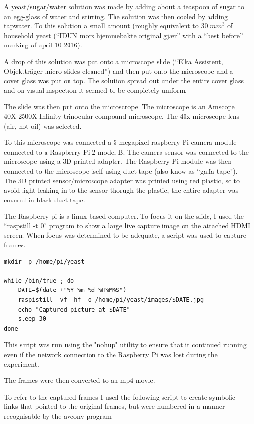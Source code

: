 \documentclass[12pt]{article}
\begin{document}
A yeast/sugar/water solution was made by adding about a teaspoon of
sugar to an egg-glass of water and stirring.  The solution was then
cooled by adding tapwater.  To this solution a small amount (roughly
equivalent to 30 \(mm^3\) of household yeast (``IDUN mors hjemmebakte
original gjær'' with a ``best before'' marking of april 10 2016).

A drop of this solution was put onto a microscope slide (``Elka
Assistent, Objektträger micro slides  cleaned'') and then put onto the
microscope and a cover glass was put on top.   The solution spread out
under the entire cover glass and on visual inspection it seemed to be
completely uniform.

The slide was then put onto the microscrope.  The microscope is an
Amscope 40X-2500X Infinity  trinocular compound microscope.   The 40x
microscope lens (air, not oil) was selected.   

To this microscope was connected a 5 megapixel raspberry Pi camera
module connected to a Raspberry Pi 2 model B.   The camera sensor was
connected to the microscope using a 3D printed adapter. The Raspberry
Pi module was then connected  to the microscope iself using duct tape
(also know as ``gaffa tape'').  The 3D printed sensor/microscope adapter was
printed using red plastic, so to avoid light leaking in to the sensor
thorugh the plastic, the entire adapter was covered in black duct tape.

The Raspberry pi is a linux based computer.  To focus it on the slide,
I used the ``raspstill -t 0'' program to show a large live capture
image on the attached HDMI screen.   When focus was determined to be
adequate, a script was used to capture frames:

\begin{lstlisting}[frame=single]
mkdir -p /home/pi/yeast

while /bin/true ; do 
    DATE=$(date +"%Y-%m-%d_%H%M%S")
    raspistill -vf -hf -o /home/pi/yeast/images/$DATE.jpg
    echo "Captured picture at $DATE"
    sleep 30
done
\end{lstlisting}

This script was run using the "nohup" utility to ensure that it
continued running even if the network connection to the Raspberry Pi
was lost during the experiment.

The frames were then converted to an mp4 movie.   

To refer to the captured frames I used the following script to create
symbolic links that pointed to the original frames, but were numbered
in a manner recognisable by the avconv program
\end{document}
